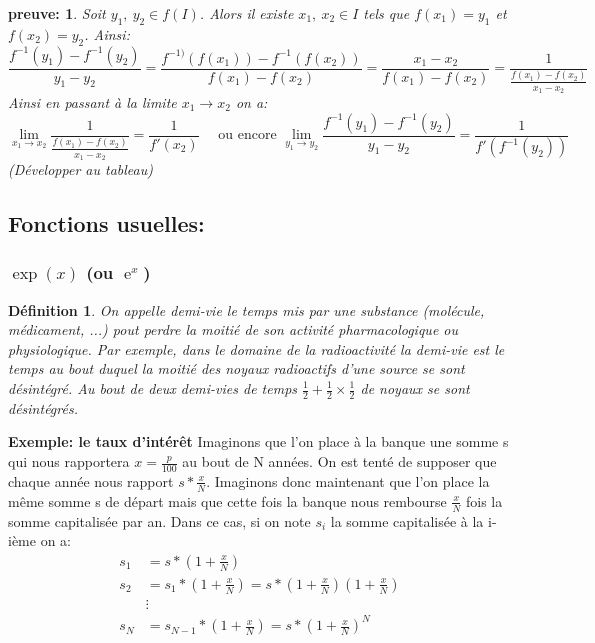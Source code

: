 \documentclass[a4paper]{article}
\theoremstyle{break}
\newtheorem{mydef}{Définition}[section]
\newtheorem*{Proof}{preuve:}
\DeclareMathOperator{\e}{e} %
\begin{document}
\begin{Proof}
  Soit $y_1, ~y_2 \in f(I)$. Alors il existe $x_1, ~x_2 \in I$ tels
  que $f(x_1) = y_1$ et $f(x_2) = y_2$. Ainsi:
  \[
    \frac{f^{-1}(y_1) - f^{-1}(y_2)}{y_1-y_2} =
    \frac{f^{-1)}(f(x_1)) - f^{-1}(f(x_2))}{f(x_1)-f(x_2)}
    = \frac{x_1 - x_2}{f(x_1)-f(x_2)}
    = \frac{1}{\frac{f(x_1)-f(x_2)}{x_1 - x_2}}
  \]
  \newline
  Ainsi en passant à la limite $x_1 \to x_2$ on a:
  \[
    \lim \limits_{x_1 \to x_2}\frac{1}{\frac{f(x_1)-f(x_2)}{x_1 -
        x_2}} = \frac{1}{f'(x_2)}
    \quad \text{ ou encore }
    \lim \limits_{y_1 \to y_2} \frac{f^{-1}(y_1)-f^{-1}(y_2)}{y_1 -
        y_2} = \frac{1}{f'(f^{-1}(y_2))}
  \]
  (Développer au tableau)
\end{Proof}

\subsection{Fonctions usuelles: }
\subsubsection{$\exp(x)$ (ou $\e^{x}$)}
\begin{mydef}
  On appelle demi-vie le temps mis par une substance (molécule,
  médicament, ...) pout perdre la moitié de son activité
  pharmacologique ou physiologique. Par exemple, dans le domaine de la
  radioactivité la demi-vie est le temps au bout duquel la moitié des
  noyaux radioactifs d'une source se sont désintégré. Au bout de deux
  demi-vies de temps $\frac{1}{2} + \frac{1}{2} \times \frac{1}{2}$ de
  noyaux se sont désintégrés. 
\end{mydef}

\textbf{Exemple: le taux d'intérêt}
Imaginons que l'on place à la banque une somme s qui nous rapportera
$x = \frac{p}{100}$ au bout de N années. On est tenté de supposer que
chaque année nous rapport $s * \frac{x}{N}$. Imaginons donc maintenant
que l'on place la même somme s de départ mais que cette fois la banque nous
rembourse $\frac{x}{N}$ fois la somme capitalisée par an. Dans ce cas,
si on note $s_i$ la somme capitalisée à la i-ième on a:
\begin{align*}
  s_1 &= s * (1 + \frac{x}{N})\\
  s_2 &= s_1 * (1 + \frac{x}{N}) = s * (1 + \frac{x}{N}) (1 +
        \frac{x}{N})\\
      & \vdots\\
  s_N &= s_{N-1} * (1 + \frac{x}{N}) =  s * (1 + \frac{x}{N})^N
\end{align*}
\end{document}
